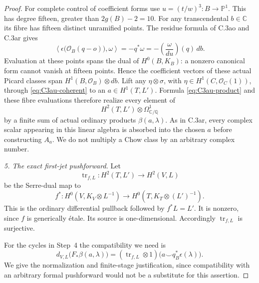 \begin{proof}
For complete control of coefficient forms use
$u=(t/w)^3:B\to\mathbb P^1$. This has degree fifteen, greater
than $2g(B)-2=10$. For any transcendental $b\in\mathbb C$ its
fibre has fifteen distinct unramified points. The residue formula
of C.3ao and C.3ar gives
\[
 \left\langle\epsilon\bigl(\mathcal O_B(q-o)\bigr),\omega\right\rangle
       =-q^*\omega
       =-\left(\frac{\omega}{du}\right)(q)\,db.
\]
Evaluation at these points spans the dual of $H^0(B,K_B)$:
a nonzero canonical form cannot vanish at fifteen points.
Hence the coefficient vectors of these actual Picard classes
span $H^1(B,\mathcal O_B)\otimes db$.
Lift any $\eta\otimes\sigma$, with
$\eta\in H^1(C,\mathcal O_C(1))$, through
\eqref{eq:C3au-coherent} to an $a\in H^1(T,L')$.
Formula \eqref{eq:C3au-product} and these fibre evaluations
therefore realize every element of
\begin{equation}\label{eq:C3au-full-span}
                    H^2(T,L')\otimes\Omega^1_{\mathbb C/\mathbb Q}
\end{equation}
by a finite sum of actual ordinary products $\beta(a,\lambda)$.
As in C.3ar, every complex scalar appearing in this linear
algebra is absorbed into the chosen $a$ before constructing
$A_a$. We do not multiply a Chow class by an arbitrary complex
number.

\emph{5. The exact first-jet pushforward.}
Let
\[
 \operatorname{tr}_{f,L}:H^2(T,L')\longrightarrow H^2(V,L)
\]
be the Serre-dual map to
\[
 f^*:H^0(V,K_V\otimes L^{-1})
                      \longrightarrow H^0(T,K_T\otimes(L')^{-1}).
\]
This is the ordinary differential pullback followed by
$f^*L=L'$. It is nonzero, since $f$ is generically \'etale.
Its source is one-dimensional. Accordingly
$\operatorname{tr}_{f,L}$ is surjective.

For the cycles in Step~4 the compatibility we need is
\begin{equation}\label{eq:C3au-trace}
 d_{V,L}\bigl(F_*\beta(a,\lambda)\bigr)
   =(\operatorname{tr}_{f,L}\otimes1)
           \bigl(a\smile q_B^*\epsilon(\lambda)\bigr).
\end{equation}
We give the normalization and finite-stage justification, since
compatibility with an arbitrary formal pushforward would not be
a substitute for this assertion.


\end{proof}
